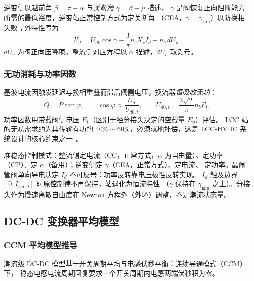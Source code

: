 逆变侧以越前角 $\beta=\pi-\alpha$ 与\emph{关断角} $\gamma=\beta-\mu$ 描述，
$\gamma$ 是阀恢复正向阻断能力所需的最低裕度，逆变站正常控制方式为定关断角
（CEA，$\gamma=\gamma_{\min}$）以防换相失败；外特性写为
\begin{equation}
U_d=U_{d0}\cos\gamma-\frac{3}{\pi}n_bX_cI_d+n_b\,dU_v,
\end{equation}
$dU_v$ 为阀正向压降项。整流侧对应方程以 $\alpha$ 描述，$dU_v$ 取负号。

\subsubsection{无功消耗与功率因数}
基波电流因触发延迟与换相重叠而滞后阀侧电压，换流器\emph{恒吸收无功}：
\begin{equation}
Q=P\tan\varphi,\qquad
\cos\varphi\approx\frac{U_d}{U_{d0,t}},\qquad
U_{d0,t}=\frac{3\sqrt2}{\pi}n_bE_t,
\end{equation}
功率因数用带载阀侧电压 $E_t$（区别于经分接头决定的空载量 $E_0$）评估。
LCC 站的无功需求约为其传输有功的 $40\%\sim60\%$，必须就地补偿，这是
LCC-HVDC 系统设计的核心约束之一~\cite{pfvs:arrillaga}。

\begin{remark}[控制模式与电流单向性]
准稳态控制模式：整流侧定电流（CC，正常方式，$\alpha$ 为自由量）、定功率
（CP）、定 $\alpha$（备用）；逆变侧定 $\gamma$（CEA，正常方式）、定电流、
定功率。晶闸管阀单向导电决定 $I_d$ 不可反号：功率反转靠电压极性反转实现。
$I_d$ 触及边界 $[0,I_{rated}]$ 时原控制律不再保持，站退化为恒流特性
（$\gamma$ 保持在 $\gamma_{\min}$ 之上）。分接头作为慢速离散自由度在
Newton 方程外（外环）调整，不是潮流状态量。
\end{remark}

\subsection{DC-DC 变换器平均模型}\label{sec:pf-th-vs-dcdc}

\subsubsection{CCM 平均模型推导}
潮流级 DC-DC 模型基于开关周期平均与电感伏秒平衡：连续导通模式（CCM）下，
稳态电感电流周期回复要求一个开关周期内电感两端伏秒积为零。

